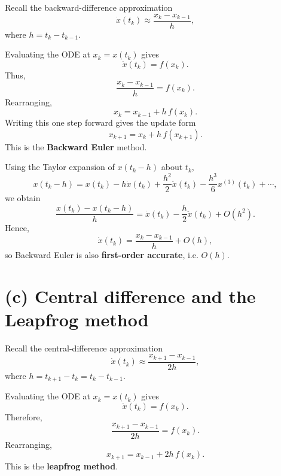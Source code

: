\documentclass[11pt]{article}
\begin{document}
Recall the backward-difference approximation
\begin{equation}
\dot{x}(t_k) \approx \frac{x_k-x_{k-1}}{h},
\end{equation}
where $h=t_k-t_{k-1}$.

Evaluating the ODE at $x_k=x(t_k)$ gives
\begin{equation}
\dot{x}(t_k)=f(x_k).
\end{equation}
Thus,
\begin{equation}
\frac{x_k-x_{k-1}}{h}=f(x_k).
\end{equation}
Rearranging,
\begin{equation}
\boxed{x_k=x_{k-1}+h\,f(x_k).}
\end{equation}
Writing this one step forward gives the update form
\begin{equation}
\boxed{x_{k+1}=x_k+h\,f(x_{k+1}).}
\end{equation}
This is the \textbf{Backward Euler} method.

Using the Taylor expansion of $x(t_k-h)$ about $t_k$,
\begin{equation}
x(t_k-h)=x(t_k)-h\dot{x}(t_k)+\frac{h^2}{2}\ddot{x}(t_k)-\frac{h^3}{6}x^{(3)}(t_k)+\cdots,
\end{equation}
we obtain
\begin{equation}
\frac{x(t_k)-x(t_k-h)}{h}=\dot{x}(t_k)-\frac{h}{2}\ddot{x}(t_k)+O(h^2).
\end{equation}
Hence,
\begin{equation}
\dot{x}(t_k)=\frac{x_k-x_{k-1}}{h}+O(h),
\end{equation}
so Backward Euler is also \textbf{first-order accurate}, i.e. \(O(h)\).

\section*{(c) Central difference and the Leapfrog method}

Recall the central-difference approximation
\begin{equation}
\dot{x}(t_k) \approx \frac{x_{k+1}-x_{k-1}}{2h},
\end{equation}
where $h=t_{k+1}-t_k=t_k-t_{k-1}$.

Evaluating the ODE at $x_k=x(t_k)$ gives
\begin{equation}
\dot{x}(t_k)=f(x_k).
\end{equation}
Therefore,
\begin{equation}
\frac{x_{k+1}-x_{k-1}}{2h}=f(x_k).
\end{equation}
Rearranging,
\begin{equation}
\boxed{x_{k+1}=x_{k-1}+2h\,f(x_k).}
\end{equation}
This is the \textbf{leapfrog method}.
\end{document}
